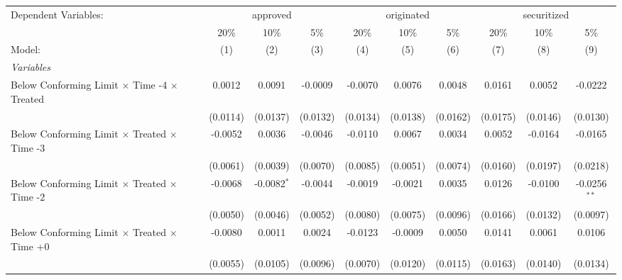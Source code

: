 \begingroup
\centering
\begin{tabular}{lccccccccc}
   \tabularnewline \midrule \midrule
   Dependent Variables: & \multicolumn{3}{c}{approved} & \multicolumn{3}{c}{originated} & \multicolumn{3}{c}{securitized}\\
                                                              & 20\%          & 10\%          & 5\%           & 20\%         & 10\%          & 5\%           & 20\%          & 10\%          & 5\% \\    
   Model:                                                     & (1)           & (2)           & (3)           & (4)          & (5)           & (6)           & (7)           & (8)           & (9)\\  
   \midrule
   \emph{Variables}\\
   Below Conforming Limit $\times$ Time -4 $\times$ Treated   & 0.0012        & 0.0091        & -0.0009       & -0.0070      & 0.0076        & 0.0048        & 0.0161        & 0.0052        & -0.0222\\   
                                                              & (0.0114)      & (0.0137)      & (0.0132)      & (0.0134)     & (0.0138)      & (0.0162)      & (0.0175)      & (0.0146)      & (0.0130)\\   
   Below Conforming Limit $\times$ Treated $\times$ Time -3   & -0.0052       & 0.0036        & -0.0046       & -0.0110      & 0.0067        & 0.0034        & 0.0052        & -0.0164       & -0.0165\\   
                                                              & (0.0061)      & (0.0039)      & (0.0070)      & (0.0085)     & (0.0051)      & (0.0074)      & (0.0160)      & (0.0197)      & (0.0218)\\   
   Below Conforming Limit $\times$ Treated $\times$ Time -2   & -0.0068       & -0.0082$^{*}$ & -0.0044       & -0.0019      & -0.0021       & 0.0035        & 0.0126        & -0.0100       & -0.0256$^{**}$\\   
                                                              & (0.0050)      & (0.0046)      & (0.0052)      & (0.0080)     & (0.0075)      & (0.0096)      & (0.0166)      & (0.0132)      & (0.0097)\\   
   Below Conforming Limit $\times$ Treated $\times$ Time +0   & -0.0080       & 0.0011        & 0.0024        & -0.0123      & -0.0009       & 0.0050        & 0.0141        & 0.0061        & 0.0106\\   
                                                              & (0.0055)      & (0.0105)      & (0.0096)      & (0.0070)     & (0.0120)      & (0.0115)      & (0.0163)      & (0.0140)      & (0.0134)\\   

\end{tabular}
